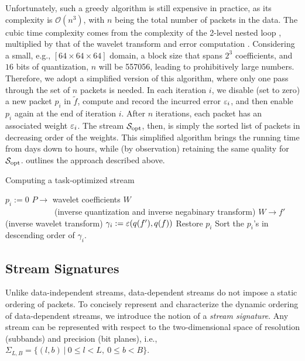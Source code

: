Unfortunately, such a greedy algorithm is still expensive in practice, as its complexity is
$\mathcal{O}(n^3)$, with $n$ being the total number of packets in the data. The cubic time
complexity comes from the complexity of the 2-level nested loop , multiplied by
that of the wavelet transform and error computation . Considering a small, e.g.,
$[64 \times 64 \times 64]$ domain, a block size that spans $2^3$ coefficients, and $16$ bits of
quantization, $n$ will be 557056, leading to prohibitively large numbers. Therefore, we adopt a
simplified version of this algorithm, where only one pass through the set of $n$ packets is needed.
In each iteration $i$, we disable (set to zero) a new packet $p_i$ in $\tilde{f}$, compute and
record the incurred error $\err_i$, and then enable $p_i$ again at the end of iteration $i$. After
$n$ iterations, each packet has an associated weight $\err_i$. The stream $\sopt$, then, is simply
the sorted list of packets in decreasing order of the weights. This simplified algorithm brings the
running time from days down to hours, while (by observation) retaining the same quality for $\sopt$.
 outlines the approach described above.

\begin{algorithm}[h]
  \caption{Computing a task-optimized stream}
  \begin{algorithmic}[1]
			\State $p_i := 0$
      \State $P \rightarrow$ wavelet coefficients $W$ \\
      		\ \ \ \ \ \ \ \ \ \ \ \ (inverse quantization and inverse negabinary transform)
			\State $W \rightarrow f'$ (inverse wavelet transform)
			\State $\gamma_i := \err(q(f'),q(f))$			
			\State Restore $p_i$
		\EndFor
		\State Sort the $p_i$'s in descending order of $\gamma_i$.
	\end{algorithmic}
	\label{alg:greedy}
\end{algorithm}

\subsection{Stream Signatures} \label{sec:stream-signature}
Unlike data-independent streams, data-dependent streams do not impose a static ordering of packets.
To concisely represent and characterize the dynamic ordering of data-dependent streams, we introduce
the notion of a \emph{stream signature}. Any stream can be represented with respect to the
two-dimensional space of resolution (subbands) and precision (bit planes), i.e., \mbox{$
\Sigma_{L,B}=\{(l,b)\ |\ 0\leq l < L,\ 0\leq b < B\}$.}

